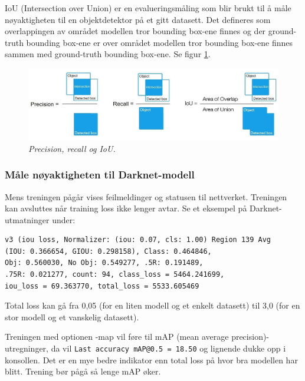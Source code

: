 IoU (Intersection over Union) er en evalueringsmåling som blir brukt til å måle nøyaktigheten til en objektdetektor på et gitt datasett. Det defineres som overlappingen av området modellen tror bounding box-ene finnes og der ground-truth bounding box-ene er over området modellen tror bounding box-ene finnes sammen med ground-truth bounding box-ene. Se figur \ref{fig:precision}. \cite{Bochkovskiy 2020}

\begin{figure}[h]
\begin{center} 
\includegraphics[scale=0.45]{figures/precision}
\caption{\small \sl Precision, recall og IoU. \cite{Bochkovskiy 2020} \label{fig:precision}}
\end{center}
\end{figure}

\subsubsection{Måle nøyaktigheten til Darknet-modell}

Mens treningen pågår vises feilmeldinger og statusen til nettverket. Treningen kan avsluttes når training loss ikke lenger avtar. Se et eksempel på Darknet-utmatninger under:

\begin{verbatim}
v3 (iou loss, Normalizer: (iou: 0.07, cls: 1.00) Region 139 Avg
(IOU: 0.366654, GIOU: 0.298158), Class: 0.464846,
Obj: 0.560030, No Obj: 0.549277, .5R: 0.191489,
.75R: 0.021277, count: 94, class_loss = 5464.241699,
iou_loss = 69.363770, total_loss = 5533.605469 
\end{verbatim}

Total loss kan gå fra 0,05 (for en liten modell og et enkelt datasett) til 3,0 (for en stor modell og et vanskelig datasett). \cite{Bochkovskiy 2020}

Treningen med optionen -map vil føre til mAP (mean average precision)-utregninger, da vil \texttt{Last accuracy mAP@0.5 = 18.50} og lignende dukke opp i konsollen. Det er en mye bedre indikator enn total loss på hvor bra modellen har blitt. Trening bør pågå så lenge mAP øker. \cite{Bochkovskiy 2020}%

